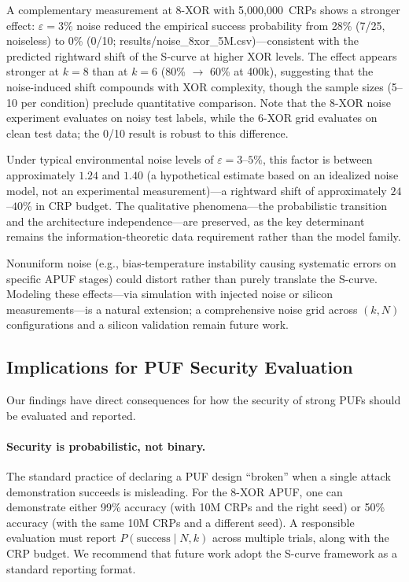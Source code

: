 A complementary measurement at 8-XOR with 5{,}000{,}000~CRPs shows a
stronger effect: $\varepsilon = 3\%$ noise reduced the empirical success
probability from 28\% (7/25, noiseless) to 0\% (0/10;
results/noise\_8xor\_5M.csv)---consistent with the predicted rightward shift
of the S-curve at higher XOR levels.  The effect appears stronger at $k=8$
than at $k=6$ (80\% $\to$ 60\% at 400k), suggesting that the noise-induced
shift compounds with XOR complexity, though the sample sizes (5--10 per
condition) preclude quantitative comparison.  Note that the 8-XOR noise
experiment evaluates on noisy test labels, while the 6-XOR grid evaluates on
clean test data; the 0/10 result is robust to this difference.

Under typical environmental noise levels of $\varepsilon = 3$--$5\%$, this
factor is between approximately $1.24$ and $1.40$ (a hypothetical estimate
based on an idealized noise model, not an experimental measurement)---a
rightward shift of approximately $24$--$40\%$ in CRP budget.  The qualitative
phenomena---the probabilistic transition and the architecture
independence---are preserved,
as the key determinant remains the information-theoretic data requirement
rather than the model family.

Nonuniform noise (e.g., bias-temperature instability causing systematic
errors on specific APUF stages) could distort rather than purely translate
the S-curve.  Modeling these effects---via simulation with injected noise or
silicon measurements---is a natural extension; a comprehensive noise grid
across $(k, N)$ configurations and a silicon validation remain future work.

\subsection{Implications for PUF Security Evaluation}
\label{sec:implications}

Our findings have direct consequences for how the security of strong PUFs
should be evaluated and reported.

\paragraph{Security is probabilistic, not binary.}
The standard practice of declaring a PUF design ``broken'' when a single
attack demonstration succeeds is misleading.  For the 8-XOR APUF, one can
demonstrate either 99\% accuracy (with 10M CRPs and the right seed) or 50\%
accuracy (with the same 10M CRPs and a different seed).  A responsible
evaluation must report $P(\text{success} \mid N, k)$ across multiple trials,
along with the CRP budget.  We recommend that future work adopt the S-curve
framework as a standard reporting format.

